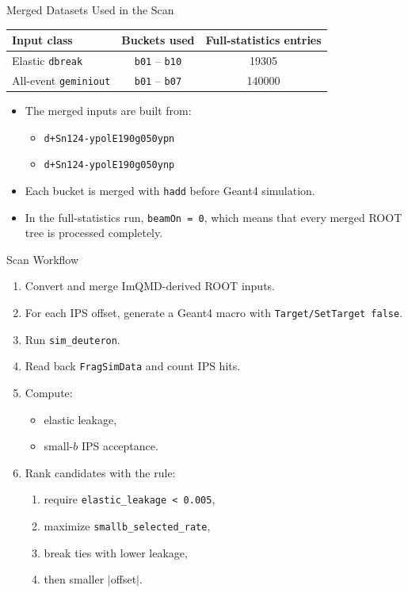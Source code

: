 \documentclass[aspectratio=169]{beamer}
\begin{document}
\begin{frame}{Merged Datasets Used in the Scan}
\begin{table}
\centering
\small
\begin{tabular}{lcc}
\toprule
Input class & Buckets used & Full-statistics entries \\
\midrule
Elastic \texttt{dbreak} & \texttt{b01} -- \texttt{b10} & 19305 \\
All-event \texttt{geminiout} & \texttt{b01} -- \texttt{b07} & 140000 \\
\bottomrule
\end{tabular}
\end{table}

\begin{itemize}
  \item The merged inputs are built from:
  \begin{itemize}
    \item \texttt{d+Sn124-ypolE190g050ypn}
    \item \texttt{d+Sn124-ypolE190g050ynp}
  \end{itemize}
  \item Each bucket is merged with \texttt{hadd} before Geant4 simulation.
  \item In the full-statistics run, \texttt{beamOn = 0}, which means that every merged ROOT tree is processed completely.
\end{itemize}
\end{frame}

\begin{frame}{Scan Workflow}
\begin{enumerate}
  \item Convert and merge ImQMD-derived ROOT inputs.
  \item For each IPS offset, generate a Geant4 macro with \texttt{Target/SetTarget false}.
  \item Run \texttt{sim\_deuteron}.
  \item Read back \texttt{FragSimData} and count IPS hits.
  \item Compute:
  \begin{itemize}
    \item elastic leakage,
    \item small-$b$ IPS acceptance.
  \end{itemize}
  \item Rank candidates with the rule:
  \begin{enumerate}
    \item require \texttt{elastic\_leakage < 0.005},
    \item maximize \texttt{smallb\_selected\_rate},
    \item break ties with lower leakage,
    \item then smaller $|$offset$|$.
  \end{enumerate}
\end{enumerate}
\end{frame}
\end{document}
